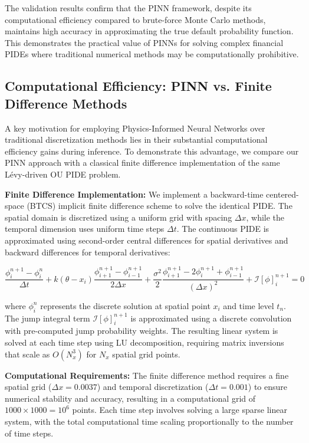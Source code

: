 \documentclass[11pt,twoside,openright]{report}
\begin{document}
The validation results confirm that the PINN framework, despite its computational efficiency compared to brute-force Monte Carlo methods, maintains high accuracy in approximating the true default probability function. This demonstrates the practical value of PINNs for solving complex financial PIDEs where traditional numerical methods may be computationally prohibitive.

\subsection{Computational Efficiency: PINN vs. Finite Difference Methods}
\label{sec:computational_efficiency}

A key motivation for employing Physics-Informed Neural Networks over traditional discretization methods lies in their substantial computational efficiency gains during inference. To demonstrate this advantage, we compare our PINN approach with a classical finite difference implementation of the same Lévy-driven OU PIDE problem.

\textbf{Finite Difference Implementation:} We implement a backward-time centered-space (BTCS) implicit finite difference scheme to solve the identical PIDE. The spatial domain is discretized using a uniform grid with spacing $\Delta x$, while the temporal dimension uses uniform time steps $\Delta t$. The continuous PIDE is approximated using second-order central differences for spatial derivatives and backward differences for temporal derivatives:

$$
\frac{\phi_{i}^{n+1} - \phi_{i}^{n}}{\Delta t} + k(\theta - x_i)\frac{\phi_{i+1}^{n+1} - \phi_{i-1}^{n+1}}{2\Delta x} + \frac{\sigma^2}{2}\frac{\phi_{i+1}^{n+1} - 2\phi_{i}^{n+1} + \phi_{i-1}^{n+1}}{(\Delta x)^2} + \mathcal{I}[\phi]_i^{n+1} = 0
$$

where $\phi_{i}^{n}$ represents the discrete solution at spatial point $x_i$ and time level $t_n$. The jump integral term $\mathcal{I}[\phi]_i^{n+1}$ is approximated using a discrete convolution with pre-computed jump probability weights. The resulting linear system is solved at each time step using LU decomposition, requiring matrix inversions that scale as $O(N_x^3)$ for $N_x$ spatial grid points.

\textbf{Computational Requirements:} The finite difference method requires a fine spatial grid ($\Delta x = 0.0037$) and temporal discretization ($\Delta t = 0.001$) to ensure numerical stability and accuracy, resulting in a computational grid of $1000 \times 1000 = 10^6$ points. Each time step involves solving a large sparse linear system, with the total computational time scaling proportionally to the number of time steps.
\end{document}
